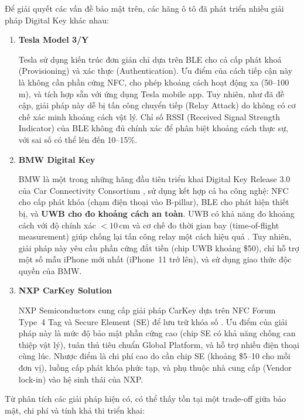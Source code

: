 Để giải quyết các vấn đề bảo mật trên, các hãng ô tô đã phát triển nhiều giải pháp Digital Key khác nhau:
\begin{enumerate}
    \item \textbf{Tesla Model 3/Y}
    
    Tesla sử dụng kiến trúc đơn giản chỉ dựa trên BLE cho cả cấp phát khoá (Provisioning) và xác thực (Authentication). Ưu điểm của cách tiếp cận này là không cần phần cứng NFC, cho phép khoảng cách hoạt động xa (50--100\,m), và tích hợp sẵn với ứng dụng Tesla mobile app. Tuy nhiên, như đã đề cập, giải pháp này dễ bị tấn công chuyển tiếp (Relay Attack) do không có cơ chế xác minh khoảng cách vật lý. Chỉ số RSSI (Received Signal Strength Indicator) của BLE không đủ chính xác để phân biệt khoảng cách thực sự, với sai số có thể lên đến 10--15\%. \cite{wouters2021tesla,gomez2012overview,heydon2013bluetooth}

    \item \textbf{BMW Digital Key} 
    
    BMW là một trong những hãng đầu tiên triển khai Digital Key Release 3.0 của Car Connectivity Consortium \cite{ccc_digikey3}, sử dụng kết hợp cả ba công nghệ: NFC cho cấp phát khóa (chạm điện thoại vào B-pillar), BLE cho phát hiện thiết bị, và \textbf{UWB cho đo khoảng cách an toàn}. UWB có khả năng đo khoảng cách với độ chính xác $<10$\,cm và cơ chế đo thời gian bay (time-of-flight measurement) giúp chống lại tấn công relay một cách hiệu quả \cite{ieee802154z,sidorenko2020accurate}. Tuy nhiên, giải pháp này yêu cầu phần cứng đắt tiền (chip UWB khoảng \$50), chỉ hỗ trợ một số mẫu iPhone mới nhất (iPhone~11 trở lên), và sử dụng giao thức độc quyền của BMW.

    \item \textbf{NXP CarKey Solution} 
    
    NXP Semiconductors cung cấp giải pháp CarKey dựa trên NFC Forum Type~4 Tag và Secure Element (SE) để lưu trữ khóa số \cite{iso14443,iso7816}. Ưu điểm của giải pháp này là mức độ bảo mật phần cứng cao (chip SE có khả năng chống can thiệp vật lý), tuân thủ tiêu chuẩn Global Platform, và hỗ trợ nhiều điện thoại cùng lúc. Nhược điểm là chi phí cao do cần chip SE (khoảng \$5--10 cho mỗi đơn vị), luồng cấp phát khóa phức tạp, và phụ thuộc nhà cung cấp (Vendor lock-in) vào hệ sinh thái của NXP.

\end{enumerate}


Từ phân tích các giải pháp hiện có, có thể thấy tồn tại một trade-off giữa bảo mật, chi phí và tính khả thi triển khai:

